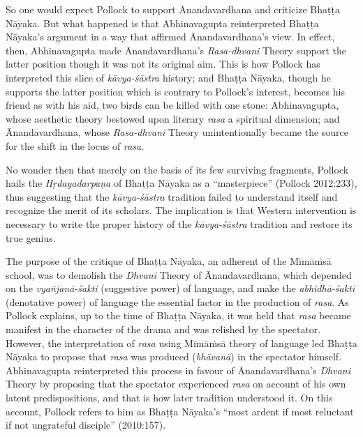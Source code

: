 So one would expect Pollock to support Ānandavardhana and criticize Bhaṭṭa Nāyaka. But what happened is that Abhinavagupta reinterpreted Bhaṭṭa Nāyaka's argument in a way that affirmed Ānandavardhana's view. In effect, then, Abhinavagupta made Ānandavardhana's \textsl{Rasa-dhvani} Theory support the latter position though it was not its original aim. This is how Pollock has interpreted this slice of \textsl{kāvya-śāstra} history; and Bhaṭṭa Nāyaka, though he supports the latter position which is contrary to Pollock's interest, becomes his friend as with his aid, two birds can be killed with one stone: Abhinavagupta, whose aesthetic theory bestowed upon literary \textsl{rasa} a spiritual dimension; and Ānandavardhana, whose \textsl{Rasa-dhvani} Theory unintentionally became the source for the shift in the locus of \textsl{rasa}. 

No wonder then that merely on the basis of its few surviving fragments, Pollock hails the \textsl{Hṛdayadarpaṇa} of Bhaṭṭa Nāyaka as a ``masterpiece'' (Pollock 2012:233), thus suggesting that the \textsl{kāvya-śāstra} tradition failed to understand itself and recognize the merit of its scholars. The implication is that Western intervention is necessary to write the proper history of the \textsl{kāvya-śāstra} tradition and restore its true genius.

The purpose of the critique of Bhaṭṭa Nāyaka, an adherent of the Mīmāṁsā school, was to demolish the \textsl{Dhvani} Theory of Ānandavardhana, which depended on the \textsl{vyañjanā-śakti} (suggestive power) of language, and make the \textsl{abhidhā-śakti} (denotative power) of language the essential factor in the production of \textsl{rasa}. As Pollock explains, up to the time of Bhaṭṭa Nāyaka, it was held that \textsl{rasa} became manifest in the character of the drama and was relished by the spectator. However, the interpretation of \textsl{rasa} using Mīmāṁsā theory of language led Bhaṭṭa Nāyaka to propose that \textsl{rasa} was produced (\textsl{bhāvanā}) in the spectator himself. Abhinavagupta reinterpreted this process in favour of Ānandavardhana's
 \textsl{Dhvani} Theory by proposing that the spectator experienced \textsl{rasa} on account of his own latent predispositions, and that is how later tradition understood it. On this account, Pollock refers to him as Bhaṭṭa Nāyaka's ``most ardent if most reluctant if not ungrateful disciple'' (2010:157). 
 
